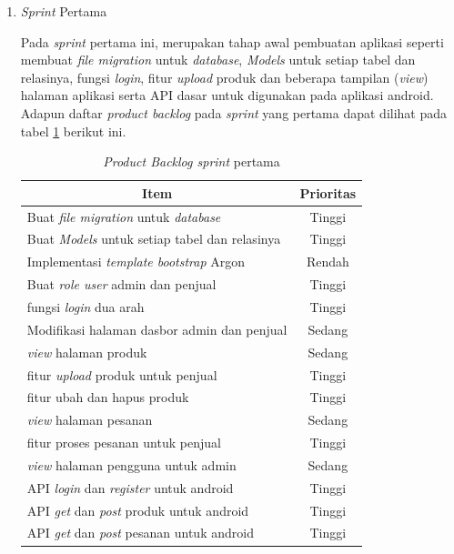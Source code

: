 \newpage
\begin{enumerate}
	\item \textit{Sprint} Pertama
	\par Pada \textit{sprint} pertama ini, merupakan tahap awal pembuatan aplikasi seperti membuat \textit{file migration} untuk \textit{database}, \textit{Models} untuk setiap tabel dan relasinya, fungsi \textit{login}, fitur \textit{upload} produk dan beberapa tampilan (\textit{view}) halaman aplikasi serta API dasar untuk digunakan pada aplikasi android. Adapun daftar \textit{product backlog} pada \textit{sprint} yang pertama dapat dilihat pada tabel \ref*{tab:sprint pertama} berikut ini.


	\addtocounter{table}{+1}
	\begin{table}[H]
		\begin{center}
		\caption{\textit{Product Backlog sprint} pertama}
		\label{tab:sprint pertama}
		\begin{tabular}{|l|c|}
		\hline
		\multicolumn{1}{|c|}{Item} & Prioritas\\
		\hline
		Buat \textit{file migration} untuk \textit{database} & Tinggi\\
		\hline
		Buat \textit{Models} untuk setiap tabel dan relasinya & Tinggi\\
		\hline
		Implementasi \textit{template bootstrap} Argon & Rendah\\
		\hline
		Buat \textit{role user} admin dan penjual & Tinggi\\
		\hline
		fungsi \textit{login} dua arah & Tinggi\\
		\hline
		Modifikasi halaman dasbor admin dan penjual & Sedang\\
		\hline
		\textit{view} halaman produk & Sedang\\
		\hline
		fitur \textit{upload} produk untuk penjual& Tinggi\\
		\hline
		fitur ubah dan hapus produk & Tinggi\\
		\hline
		\textit{view} halaman pesanan & Sedang\\
		\hline
		fitur proses pesanan untuk penjual & Tinggi\\
		\hline
		\textit{view} halaman pengguna untuk admin & Sedang\\
		\hline
		API \textit{login} dan \textit{register} untuk android & Tinggi\\
		\hline
		API \textit{get} dan \textit{post} produk untuk android & Tinggi\\
		\hline
		API \textit{get} dan \textit{post} pesanan untuk android & Tinggi\\
		\hline
		\end{tabular}
		\end{center}
	\end{table}


\end{enumerate}
